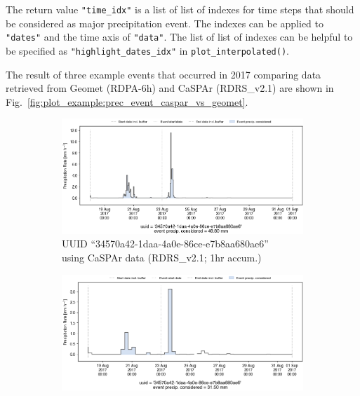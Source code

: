 \documentclass[10pt,a4paper,titlepage,parskip]{scrartcl}
\begin{document}
\vspace*{-0.3cm}
The return value \texttt{"time\_idx"} is a list of list of indexes for time steps that should be considered as major precipitation event. The indexes can be applied to \texttt{"dates"} and the time axis of \texttt{"data"}. The list of list of indexes can be helpful to be specified as \texttt{"highlight\_dates\_idx"} in \texttt{plot\_interpolated()}.

The result of three example events that occurred in 2017 comparing data retrieved from Geomet (RDPA-6h) and CaSPAr (RDRS\_v2.1) are shown in Fig.~\ref{fig:plot_example:prec_event_caspar_vs_geomet}.

\begin{figure}[h]
	\begin{subfigure}[a]{0.48\textwidth}
		\centering
		\includegraphics[width=\linewidth]{figures/compare_Geomet_CaSPAr/interpolated_at_stations_occurrence_883_identified-timesteps_RDRS_v2.1.png}
		\caption{UUID ``34570a42-1daa-4a0e-86ce-e7b8aa680ae6''\\using CaSPAr data (RDRS\_v2.1; 1hr accum.)}
	\end{subfigure}
	\hspace*{0.05\linewidth}
	\begin{subfigure}[a]{0.48\textwidth}
		\centering
		\includegraphics[width=\linewidth]{figures/compare_Geomet_CaSPAr/interpolated_at_stations_occurrence_883_identified-timesteps_rdpa_10km_6f.png}

\end{subfigure}
\end{figure}
\end{document}
